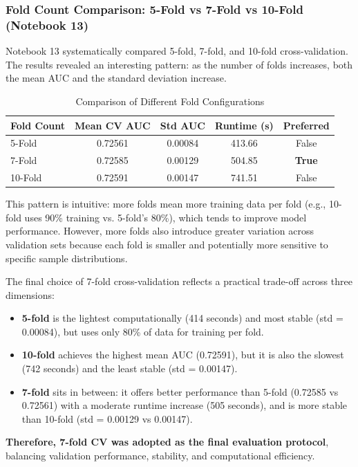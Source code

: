 \documentclass[a4paper,11pt]{article}
\begin{document}
\subsubsection{Fold Count Comparison: 5-Fold vs 7-Fold vs 10-Fold (Notebook 13)}
Notebook 13 systematically compared 5-fold, 7-fold, and 10-fold cross-validation. The results revealed an interesting pattern: as the number of folds increases, both the mean AUC and the standard deviation increase.

\begin{table}[H]
\centering
\caption{Comparison of Different Fold Configurations}
\label{tab:fold_comparison}
\begin{tabular}{lcccc}
\toprule
\textbf{Fold Count} & \textbf{Mean CV AUC} & \textbf{Std AUC} & \textbf{Runtime (s)} & \textbf{Preferred} \\
\midrule
5-Fold & 0.72561 & 0.00084 & 413.66 & False \\
7-Fold & 0.72585 & 0.00129 & 504.85 & \textbf{True} \\
10-Fold & 0.72591 & 0.00147 & 741.51 & False \\
\bottomrule
\end{tabular}
\end{table}

This pattern is intuitive: more folds mean more training data per fold (e.g., 10-fold uses 90\% training vs. 5-fold's 80\%), which tends to improve model performance. However, more folds also introduce greater variation across validation sets because each fold is smaller and potentially more sensitive to specific sample distributions.

The final choice of 7-fold cross-validation reflects a practical trade-off across three dimensions:
\begin{itemize}
    \item \textbf{5-fold} is the lightest computationally (414 seconds) and most stable (std = 0.00084), but uses only 80\% of data for training per fold.
    \item \textbf{10-fold} achieves the highest mean AUC (0.72591), but it is also the slowest (742 seconds) and the least stable (std = 0.00147).
    \item \textbf{7-fold} sits in between: it offers better performance than 5-fold (0.72585 vs 0.72561) with a moderate runtime increase (505 seconds), and is more stable than 10-fold (std = 0.00129 vs 0.00147).
\end{itemize}

\textbf{Therefore, 7-fold CV was adopted as the final evaluation protocol}, balancing validation performance, stability, and computational efficiency.
\end{document}
